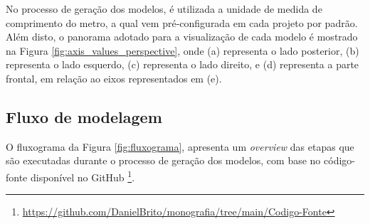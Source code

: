 No processo de geração dos modelos, é utilizada a unidade de medida de comprimento do metro, a qual vem pré-configurada em cada projeto por padrão. Além disto, o panorama adotado para a visualização de cada modelo é mostrado na Figura \ref{fig:axis_values_perspective}, onde (a) representa o lado posterior, (b) representa o lado esquerdo, (c) representa o lado direito, e (d) representa a parte frontal, em relação ao eixos representados em (e).

\begin{figure}[h!]
	\centering
	\captionsetup{width=15cm}
	{}	
\end{figure}

\subsection{Fluxo de modelagem}
\label{sec:fluxo_modelagem}

O fluxograma da Figura \ref{fig:fluxograma}, apresenta um \textit{overview} das etapas que são executadas durante o processo de geração dos modelos, com base no código-fonte disponível no GitHub \footnote{\href{https://github.com/DanielBrito/monografia/tree/main/Codigo-Fonte}{https://github.com/DanielBrito/monografia/tree/main/Codigo-Fonte}}.

